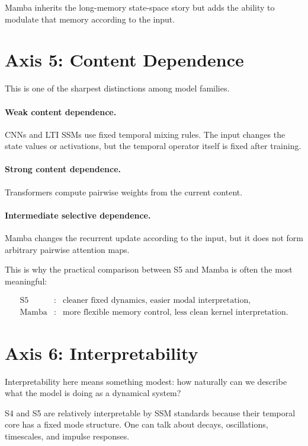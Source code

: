 Mamba inherits the long-memory state-space story but adds the ability to modulate that
memory according to the input.

\section{Axis 5: Content Dependence}

This is one of the sharpest distinctions among model families.

\paragraph{Weak content dependence.}
CNNs and LTI SSMs use fixed temporal mixing rules. The input changes the state values or
activations, but the temporal operator itself is fixed after training.

\paragraph{Strong content dependence.}
Transformers compute pairwise weights from the current content.

\paragraph{Intermediate selective dependence.}
Mamba changes the recurrent update according to the input, but it does not form arbitrary
pairwise attention maps.

This is why the practical comparison between S5 and Mamba is often the most meaningful:

\[
\begin{array}{lll}
\text{S5} &:& \text{cleaner fixed dynamics, easier modal interpretation}, \\
\text{Mamba} &:& \text{more flexible memory control, less clean kernel interpretation}.
\end{array}
\]

\section{Axis 6: Interpretability}

Interpretability here means something modest: how naturally can we describe what the model
is doing as a dynamical system?

S4 and S5 are relatively interpretable by SSM standards because their temporal core has a
fixed mode structure. One can talk about decays, oscillations, timescales, and impulse
responses.

